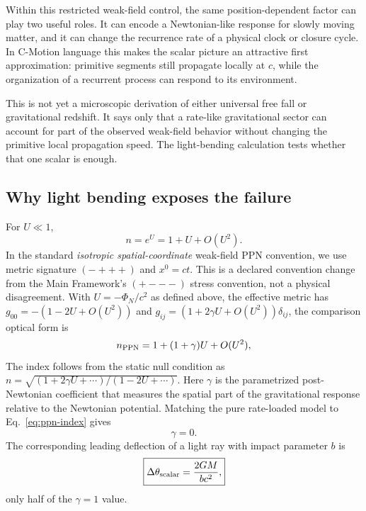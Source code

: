 \documentclass[11pt]{article}
\newcommand{\cmotion}{\mbox{C-Motion}}
\newcommand{\cmc}{c}
\theoremstyle{plain}
\theoremstyle{remark}
\begin{document}
Within this restricted weak-field control, the same position-dependent factor can play
two useful roles.  It can encode a Newtonian-like response for slowly moving matter, and
it can change the recurrence rate of a physical clock or closure cycle.  In \cmotion{}
language this makes the scalar picture an attractive first approximation: primitive
segments still propagate locally at $c$, while the organization of a recurrent process
can respond to its environment.

This is not yet a microscopic derivation of either universal free fall or gravitational
redshift.  It says only that a rate-like gravitational sector can account for part of the
observed weak-field behavior without changing the primitive local propagation speed.  The
light-bending calculation tests whether that one scalar is enough.

\subsection{Why light bending exposes the failure}
\label{sec:scalar-failure}

For $U\ll1$,
\begin{equation}
n=e^U=1+U+O(U^2).
\end{equation}
In the standard \emph{isotropic spatial-coordinate} weak-field PPN convention,
we use metric signature $(-+++)$ and $x^0=ct$.  This is a declared convention
change from the Main Framework's $(+---)$ stress convention, not a physical
disagreement.  With $U=-\Phi_N/c^2$ as defined above, the effective metric has $g_{00}=-(1-2U+O(U^2))$ and
$g_{ij}=(1+2\gamma U+O(U^2))\delta_{ij}$, the comparison optical form is
\begin{equation}
n_{\rm PPN}=1+(1+\gamma)U+O(U^2),
\label{eq:ppn-index}
\end{equation}
The index follows from the static null condition as
$n=\sqrt{(1+2\gamma U+\cdots)/(1-2U+\cdots)}$.
Here $\gamma$ is the parametrized post-Newtonian coefficient that measures the spatial
part of the gravitational response relative to the Newtonian potential.  Matching the
pure rate-loaded model to Eq.~\eqref{eq:ppn-index} gives
\begin{equation}
\boxed{\gamma=0.}
\label{eq:gamma0}
\end{equation}
The corresponding leading deflection of a light ray with impact parameter $b$ is
\begin{equation}
\boxed{
\Delta\theta_{\rm scalar}
=\frac{2GM}{b\cmc^2},}
\label{eq:half-bending}
\end{equation}
only half of the $\gamma=1$ value.
\end{document}
